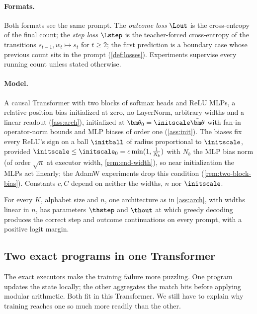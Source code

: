 \paragraph{Formats.} Both formats see the same prompt. The \emph{outcome loss} $\Lout$ is the cross-entropy of the final
count; the \emph{step loss} $\Lstep$ is the teacher-forced cross-entropy of the transitions $s_{t-1},w_t\mapsto s_t$ for
$t\ge2$; the first prediction is a boundary case whose previous count sits in the prompt (\cref{def:losses}). Experiments
supervise every running count unless stated otherwise.

\paragraph{Model.} A causal Transformer with two blocks of softmax heads and ReLU MLPs, a relative position bias
initialized at zero, no LayerNorm, arbitrary widths and a linear readout (\cref{ass:arch}), initialized at
$\bm\theta_0=\initscale\tilde{\bm\theta}$ with fan-in operator-norm bounds and MLP biases of order one (\cref{ass:init}). The biases fix
every ReLU's sign on a ball $\initball$ of radius proportional to $\initscale$, provided
$\initscale\le\initscale_0=c\min(1,\frac{1}{N_b})$ with $N_b$ the MLP bias norm (of order $\sqrt n$ at executor width, \cref{rem:end-width}), so near initialization the MLPs act linearly;
the AdamW experiments drop this condition (\cref{rem:two-block-bias}). Constants $c,C$ depend on neither the widths, $n$ nor
$\initscale$.

\begin{proposition}
\label{prop:represent}
For every $K$, alphabet size and $n$, one architecture as in \cref{ass:arch}, with widths linear in $n$, has parameters
$\thstep$ and $\thout$ at which greedy decoding produces the correct step and outcome continuations on every prompt, with
a positive logit margin.
\end{proposition}

\subsection{Two exact programs in one Transformer}
\label{sec:exact-programs}
The exact executors make the training failure more puzzling. One program updates the state locally; the other aggregates the match
bits before applying modular arithmetic. Both fit in this Transformer. We still have to explain why training reaches one so much
more readily than the other.

